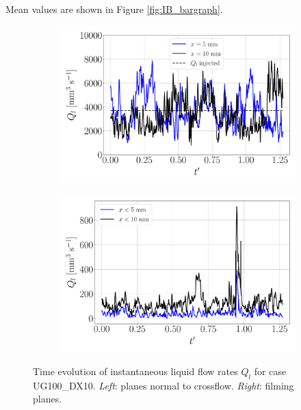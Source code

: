 Mean values are shown in Figure \ref{fig:IB_bargraph}.

\clearpage

\begin{figure}[ht]
\flushleft
\begin{subfigure}[b]{0.45\textwidth}
	\centering
   \includegraphics[scale=0.225]{./part2_developments/figures_ch5_resolved_JICF/flow_rates_ibs/inst_Q_iso_x_UG100_dx10}
\end{subfigure}
\hspace{0.4in}
\begin{subfigure}[b]{0.45\textwidth}
	\centering
   \includegraphics[scale=0.225]{./part2_developments/figures_ch5_resolved_JICF/flow_rates_ibs/inst_Q_iso_x_UG100_dx10_filming}
\end{subfigure}
\caption[Instantaneous liquid flow rates $Q_l$ for case UG100\_DX10.]{Time evolution of instantaneous liquid flow rates $Q_l$ for case UG100\_DX10. \textsl{Left}: planes normal to crossflow. \textsl{Right}: filming planes.}
\label{fig:IB_liquid_flow_rate_inst_evolution_UG100_DX10}
\end{figure}


